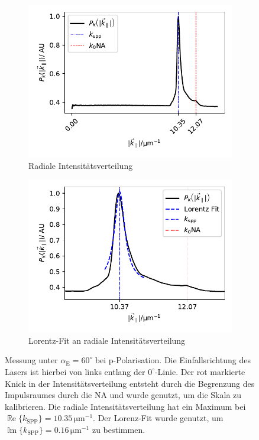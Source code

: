\documentclass[titlepage,  ngerman]{article}
\renewcommand{\Re}{\operatorname{\mathbb{R}e}}
\renewcommand{\Im}{\operatorname{\mathbb{I}m}}
\begin{document}
\begin{figure}[h]
\begin{subfigure}{0.5\textwidth}
				\includegraphics[width=\textwidth]{figures/new/4_1_radial_int.pdf}
				\caption{Radiale Intensitätsverteilung}
				\label{fig:radial_profile}			
			\end{subfigure}
			\hfill
			\begin{subfigure}{0.49\textwidth}
				\centering
				\includegraphics[width=\textwidth]{figures/new/4_1_lorenz_profile.pdf}
				\caption{Lorentz-Fit an radiale Intensitätsverteilung}
				\label{fig:lorenz_profile}			
			\end{subfigure}
	
		\caption[Messwerte bei linearer Polarisation]{Messung unter $\alpha_{\mathrm{E}} = 60^\circ$ bei p-Polarisation. Die Einfallsrichtung des Lasers ist hierbei von links entlang der $0^\circ$-Linie. Der rot markierte Knick in der Intensitätsverteilung entsteht durch die Begrenzung des Impulsraumes durch die NA und wurde genutzt, um die Skala zu kalibrieren. Die radiale Intensitätsverteilung  hat ein Maximum bei $\Re\{k_{\mathrm{SPP}}\}= 10.35\,\mathrm{\mu m ^{-1}}$. Der Lorenz-Fit  wurde genutzt, um $\Im\{k_{\mathrm{SPP}}\}= 0.16\,\mathrm{\mu m ^{-1}}$ zu bestimmen.}
		\label{fig:example_measure}			
	\end{figure}
\end{document}
